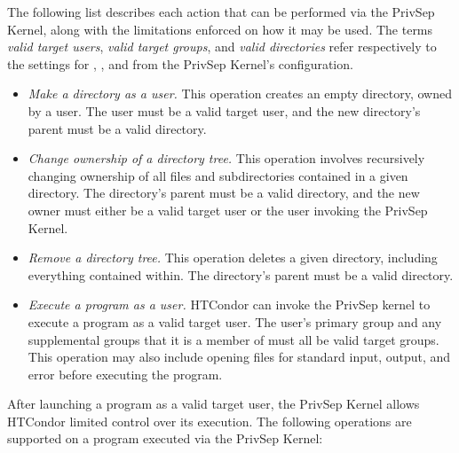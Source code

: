 The following list describes each action that can be performed via the
PrivSep Kernel, along with the limitations enforced on how it may be
used. The terms \emph{valid target users}, \emph{valid target groups},
and \emph{valid directories} refer respectively to the settings for
, , and
 from the PrivSep Kernel's configuration.

\begin{itemize}

\item \emph{Make a directory as a user.} This operation creates
an empty directory, owned by a user. The user must be a valid target
user, and the new directory's parent must be a valid directory.

\item \emph{Change ownership of a directory tree.} This operation
involves recursively changing ownership of all files and
subdirectories contained in a given directory. The directory's parent
must be a valid directory, and the new owner must either be a valid
target user or the user invoking the PrivSep Kernel.

\item \emph{Remove a directory tree.} This operation deletes a given directory,
including everything contained within. The directory's parent must be
a valid directory.

\item \emph{Execute a program as a user.} HTCondor can invoke the
PrivSep kernel to execute a program as a valid target user. The user's
primary group and any supplemental groups that it is a member of must
all be valid target groups. This operation may also include opening
files for standard input, output, and error before executing the
program.

\end{itemize}

After launching a program as a valid target user, the PrivSep Kernel
allows HTCondor limited control over its execution. The following
operations are supported on a program executed via the PrivSep Kernel:

